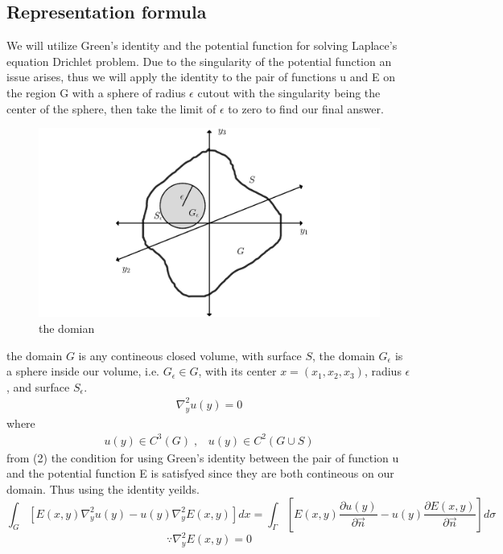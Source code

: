 \documentclass[]{article}
\begin{document}
\subsection{Representation formula}
We will utilize Green's identity and the potential function for solving Laplace's equation Drichlet problem. Due to the singularity of the potential function an issue arises, thus we will apply the identity to the pair of functions u and E on the region G with a sphere of radius $\epsilon$ cutout with the singularity being the center of the sphere, then take the limit of $\epsilon$ to zero to find our final answer.
\begin{figure}[h]
\begin{center}
\includegraphics[scale=0.15]{rep.png}
\captionlabelfalse
\caption{the domian}
\end{center}
\end{figure}
the domain $G$ is any contineous closed volume, with surface $S$, the domain $G_\epsilon$ is a sphere inside our volume, i.e. $G_\epsilon \in G$, with its center $x = (x_1,x_2,x_3)$, radius $\epsilon$, and surface $S_\epsilon$. 
\begin{align}
\nabla_{y}^{2} u(y) =0
\end{align}
where
\begin{align}
u(y) \in C^3(G)\;,\;\;\; u(y) \in C^2(G\cup S)
\end{align}
from (2) the condition for using Green's identity between the pair of function u and the potential function E is satisfyed since they are both contineous on our domain. Thus using the identity yeilds.
\[
    \int_G \left[E(x,y)\nabla_{y}^{2} u(y) - u(y)\nabla_{y}^{2} E(x,y)\right]dx = \int_\Gamma \left[E(x,y)\frac{\partial u(y)}{\partial \vec{n}}-u(y)\frac{\partial E(x,y)}{\partial \vec{n}}\right] d\sigma    
\]
\[
  \because \nabla_{y}^{2} E(x,y) = 0    
\]
\end{document}
